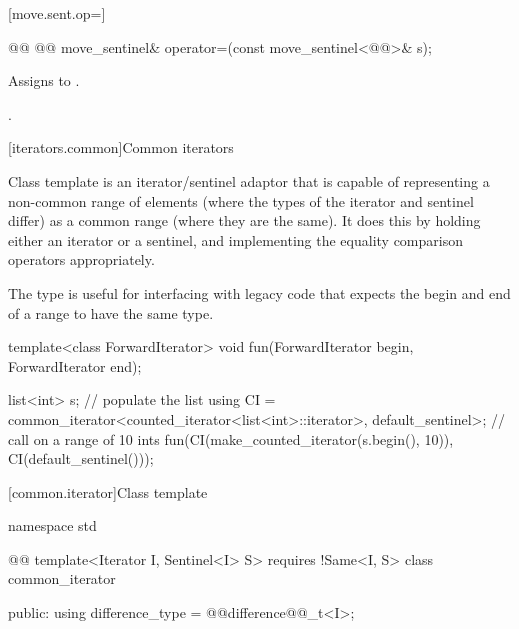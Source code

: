 \begin{addedblock}
[move.sent.op=]{}

%
%
\begin{itemdecl}
@@
  @@ move_sentinel& operator=(const move_sentinel<@@>& s);
\end{itemdecl}

\begin{itemdescr}
\pnum
\effects Assigns  to .

\pnum
\returns {}.
\end{itemdescr}



[iterators.common]{Common iterators}

\pnum
Class template  is an iterator/sentinel adaptor that is
capable of representing a non-common range of elements (where the types of the
iterator and sentinel differ) as a common range (where they are the same). It
does this by holding either an iterator or a sentinel, and implementing the
equality comparison operators appropriately.

\pnum
\begin{note}
The  type is useful for interfacing with legacy
code that expects the begin and end of a range to have the same type.
\end{note}

\pnum
\begin{example}
\begin{codeblock}
template<class ForwardIterator>
void fun(ForwardIterator begin, ForwardIterator end);

list<int> s;
// populate the list 
using CI =
  common_iterator<counted_iterator<list<int>::iterator>,
                  default_sentinel>;
// call  on a range of 10 ints
fun(CI(make_counted_iterator(s.begin(), 10)),
    CI(default_sentinel()));
\end{codeblock}
\end{example}

[common.iterator]{Class template }

%
\begin{codeblock}
namespace std { @@
  template<Iterator I, Sentinel<I> S>
    requires !Same<I, S>
  class common_iterator {
  public:
    using difference_type = @@difference@@_t<I>;

}}
\end{codeblock}
\end{addedblock}
